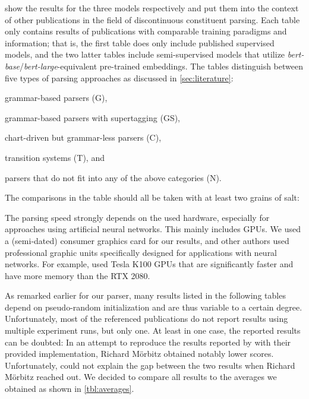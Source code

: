 \documentclass[../../document.tex]{subfiles}
\begin{document}
     show the results for the three models respectively and put them into the context of other publications in the field of discontinuous constituent parsing.
    Each table only contains results of publications with comparable training paradigms and information; that is, the first table does only include published supervised models, and the two latter tables include semi-supervised models that utilize \emph{bert-base}/\emph{bert-large}-equivalent pre-trained embeddings.
    The tables distinguish between five types of parsing approaches as discussed in \cref{sec:literature}:
    \begin{compactitem}
        \item grammar-based parsers (G),
        \item grammar-based parsers with supertagging (GS),
        \item chart-driven but grammar-less parsers (C),
        \item transition systems (T), and
        \item parsers that do not fit into any of the above categories (N).
    \end{compactitem}
    The comparisons in the table should all be taken with at least two grains of salt:
    \begin{inparaenum}
        \item The parsing speed strongly depends on the used hardware, especially for approaches using artificial neural networks. This mainly includes GPUs. We used a (semi-dated) consumer graphics card for our results, and other authors used professional graphic units specifically designed for applications with neural networks. For example, \citet{Cor20} used Tesla K100 GPUs that are significantly faster and have more memory than the RTX 2080.
        \item As remarked earlier for our parser, many results listed in the following tables depend on pseudo-random initialization and are thus variable to a certain degree. Unfortunately, most of the referenced publications do not report results using multiple experiment runs, but only one. At least in one case, the reported results can be doubted: In an attempt to reproduce the results reported by \citet{Cor20} with their provided implementation, Richard Mörbitz obtained notably lower scores. Unfortunately, \citeauthor{Cor20} could not explain the gap between the two results when Richard Mörbitz reached out. We decided to compare all results to the averages we obtained as shown in \cref{tbl:averages}.
    \end{inparaenum}
\end{document}
